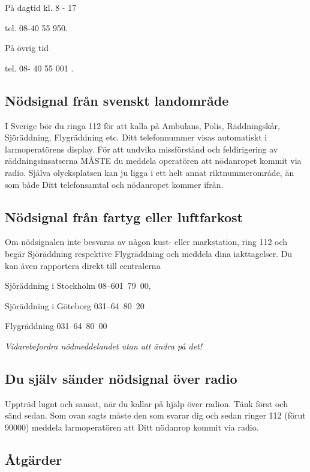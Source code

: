 På dagtid kl. 8 - 17

tel. 08-40 55 950.

På övrig tid

tel. 08- 40 55 001 .


\subsection{Nödsignal från svenskt landområde}

I Sverige bör du ringa 112 för att kalla på Ambulans, Polis,
Räddningskår, Sjöräddning, Flygräddning etc. Ditt telefonnummer visas
automatiskt i larmoperatörens display.  För att undvika missförstånd och
feldirigering av räddningsinsatserna MÅSTE du meddela operatören att nödanropet
kommit via radio. Själva olycksplatsen kan ju ligga i ett helt annat
riktnummerområde, än som både Ditt telefonsamtal och nödanropet kommer ifrån.

\subsection{Nödsignal från fartyg eller luftfarkost}

Om nödsignalen inte besvaras av någon kust- eller markstation, ring 112
och begär Sjöräddning respektive Flygräddning och meddela dina
iakttagelser. Du kan även rapportera direkt till centralerna

Sjöräddning i Stockholm 08--601~79~00,

Sjöräddning i Göteborg 031--64~80~20

Flygräddning 031--64~80~00

\emph{Vidarebefordra nödmeddelandet utan att ändra på det!}

\subsection{Du själv sänder nödsignal över radio}

Uppträd lugnt och sansat, när du kallar på hjälp över radion. Tänk först och
sänd sedan. Som ovan sagts måste den som svarar dig och sedan ringer 112 (förut
90000) meddela larmoperatören att Ditt nödanrop kommit via radio.

\subsection{Åtgärder}

